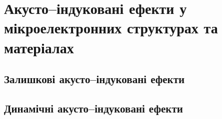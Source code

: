 \chapter{Акусто--індуковані ефекти у мікроелектронних структурах та матеріалах\label{Oglyad}}
\section{Залишкові акусто--індуковані ефекти}
\section{Динамічні акусто--індуковані ефекти}